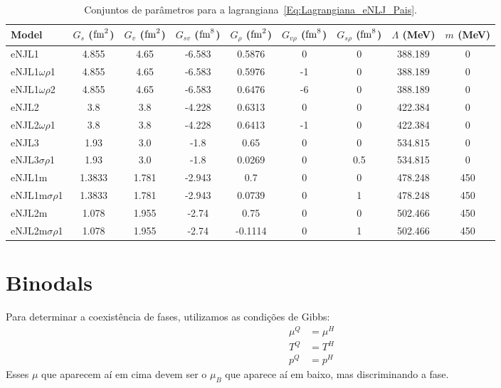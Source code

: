 \documentclass[prc, reprint, amsmath, linenumbers,10pt]{revtex4-1}
\begin{document}
\begin{table*}
\caption{Conjuntos de parâmetros para a lagrangiana~\eqref{Eq:Lagrangiana_eNLJ_Pais}\cite{Pais2016}. \label{Tab:Parametros_eNJL}}
\begin{ruledtabular}
\begin{tabular}{lcccccccc}
Model & $G_s$ ($\rm{fm}^2$) & $G_v$ ($\rm{fm}^2$) & $G_{sv}$ ($\rm{fm}^8$) & $G_\rho$ ($\rm{fm}^2$) & $G_{v\rho}$ ($\rm{fm}^8$) & $G_{s\rho}$ ($\rm{fm}^8$) & $\Lambda$ (MeV) & $m$ (MeV) \\
\hline
eNJL1 & 4.855 & 4.65 & -6.583 & 0.5876 & 0 & 0 & 388.189 & 0 \\
eNJL1$\omega\rho$1 & 4.855 & 4.65 & -6.583 & 0.5976 & -1 & 0 & 388.189 & 0 \\
eNJL1$\omega\rho$2 & 4.855 & 4.65 & -6.583 & 0.6476 & -6 & 0 & 388.189 & 0 \\
eNJL2 & 3.8 & 3.8 & -4.228 & 0.6313 & 0 & 0 & 422.384 & 0 \\
eNJL2$\omega\rho$1 & 3.8 & 3.8 & -4.228 & 0.6413 & -1 & 0 & 422.384 & 0 \\
eNJL3 & 1.93 & 3.0 & -1.8 & 0.65 & 0 & 0 & 534.815 & 0 \\
eNJL3$\sigma\rho$1 & 1.93 & 3.0 & -1.8 & 0.0269 & 0 & 0.5 & 534.815 & 0 \\
eNJL1m & 1.3833 & 1.781 & -2.943 & 0.7 & 0 & 0 & 478.248 & 450 \\
eNJL1m$\sigma\rho$1 & 1.3833 & 1.781 & -2.943 & 0.0739 & 0 & 1 & 478.248 & 450 \\
eNJL2m & 1.078 & 1.955 & -2.74 & 0.75 & 0 & 0 & 502.466 & 450 \\
eNJL2m$\sigma\rho$1 & 1.078 & 1.955 & -2.74 & -0.1114 & 0 & 1 & 502.466 & 450 \\
\end{tabular}
\end{ruledtabular}
\end{table*}

\section{Binodals}

Para determinar a coexistência de fases, utilizamos as condições de Gibbs:
\begin{align}
\mu^Q &= \mu^H \\
T^Q &= T^H \\
p^Q &= p^H
\end{align}
%
Esses $\mu$ que aparecem aí em cima devem ser o $\mu_B$ que aparece aí em baixo, mas discriminando a fase.
\end{document}
